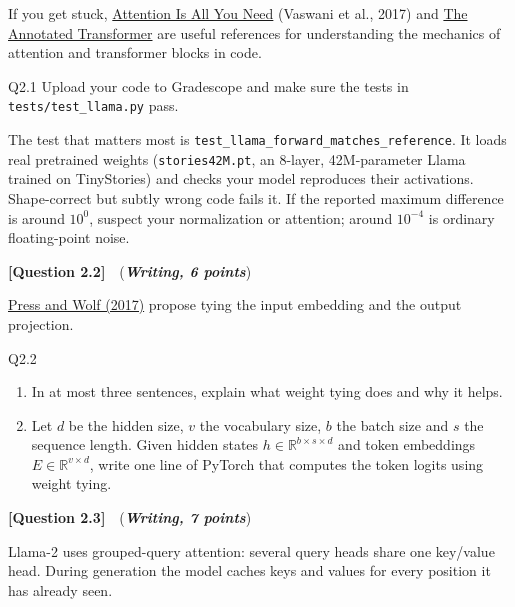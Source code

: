 \documentclass[11pt]{article}
\newcommand{\question}[3]{%
  \vspace{0.9em}
  \noindent\textbf{[Question #1]}\ \ (\textit{\textbf{#2, #3 points}})\quad
}
\begin{document}
\noindent If you get stuck, \href{https://arxiv.org/pdf/1706.03762}{Attention Is All You Need}
(Vaswani et al., 2017) and \href{https://nlp.seas.harvard.edu/annotated-transformer/}{The Annotated
Transformer} are useful references for understanding the mechanics of attention and transformer
blocks in code.

\begin{deliverables}{Q2.1}
Upload your code to Gradescope and make sure the tests in \texttt{tests/test\_llama.py} pass.

\vspace{4pt}
\noindent The test that matters most is \texttt{test\_llama\_forward\_matches\_reference}. It loads
real pretrained weights (\texttt{stories42M.pt}, an 8-layer, 42M-parameter Llama trained on
TinyStories) and checks your model reproduces their activations. Shape-correct but subtly wrong
code fails it. If the reported maximum difference is around $10^{0}$, suspect your normalization or
attention; around $10^{-4}$ is ordinary floating-point noise.
\end{deliverables}

\question{2.2}{Writing}{6}
\href{https://arxiv.org/abs/1608.05859}{Press and Wolf (2017)} propose tying the input embedding
and the output projection.

\begin{deliverables}{Q2.2}
\begin{enumerate}[label=\Alph*., leftmargin=1.6em]
  \item In at most three sentences, explain what weight tying does and why it helps.
  \item Let $d$ be the hidden size, $v$ the vocabulary size, $b$ the batch size and $s$ the
    sequence length. Given hidden states $h \in \mathbb{R}^{b \times s \times d}$ and token
    embeddings $E \in \mathbb{R}^{v \times d}$, write one line of PyTorch that computes the token
    logits using weight tying.
\end{enumerate}
\end{deliverables}

\question{2.3}{Writing}{7}
Llama-2 uses grouped-query attention: several query heads share one key/value head. During
generation the model caches keys and values for every position it has already seen.
\end{document}
